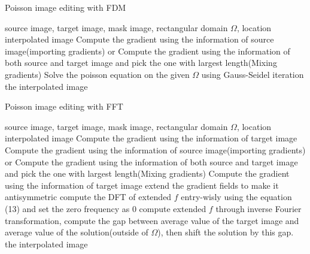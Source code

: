 \documentclass[11pt]{article}
\renewcommand{\algorithmicrequire}{ \textbf{function:}}
\renewcommand{\algorithmicreturn}{ \textbf{end function}}
\begin{document}
	\begin{algorithm}[H]
		\caption{Poisson image editing with FDM}
		\renewcommand{\algorithmicrequire}{\textbf{Input:}}
		\renewcommand{\algorithmicensure}{\textbf{Output:}}
		\renewcommand{\algorithmicreturn}{\textbf{Return:}}
		\begin{algorithmic}[1]
			\REQUIRE source image, target image, mask image, rectangular domain $\Omega$, location
			\ENSURE interpolated image
					\STATE Compute the gradient using the information of source image(importing gradients) or Compute the gradient using the information of both source and target image and pick the one with largest length(Mixing gradients)
				\ENDIF
			\ENDFOR
			\STATE Solve the poisson equation on the given $\Omega$ using Gauss-Seidel iteration
			\RETURN the interpolated image
		\end{algorithmic}
	\end{algorithm}
	
	\begin{algorithm}[H]
		\caption{Poisson image editing with FFT}
		\renewcommand{\algorithmicrequire}{\textbf{Input:}}
		\renewcommand{\algorithmicensure}{\textbf{Output:}}
		\renewcommand{\algorithmicreturn}{\textbf{Return:}}
		\begin{algorithmic}[1]
			\REQUIRE source image, target image, mask image, rectangular domain $\Omega$, location
			\ENSURE interpolated image
					\STATE Compute the gradient using the information of target image
				\ELSE
						\STATE Compute the gradient using the information of source image(importing gradients) or Compute the gradient using the information of both source and target image and pick the one with largest length(Mixing gradients)
					\ELSE
						Compute the gradient using the information of target image
					\ENDIF
				\ENDIF
			\ENDFOR
			\STATE extend the gradient fields to make it antisymmetric
			\STATE compute the DFT of extended $f$ entry-wisly using the equation (13) and set the zero frequency as 0
			\STATE compute extended $f$ through inverse Fourier transformation, compute the gap between average value of the target image and average value of the solution(outside of $\Omega$), then shift the solution by this gap.
			\RETURN the interpolated image
		\end{algorithmic}
	\end{algorithm}
\end{document}
